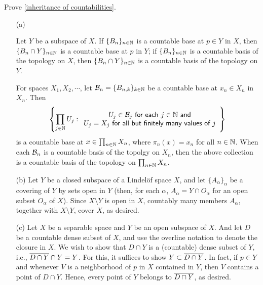 \begin{prob}\label{inheritance: countabilities}
    Prove \cref{inheritance of countabilities}.
\end{prob}
\begin{sol}
    \begin{enumerate}
        \item[(a)]
        {
            Let $Y$ be a subspace of $X$.
            If $\{B_n\}_{n\in{\mathbb{N}}}$ is a countable base at $p\in Y$ in $X$, then $\{B_n\cap Y\}_{n\in{\mathbb{N}}}$ is a countable base at $p$ in $Y$; if $\{B_n\}_{n\in{\mathbb{N}}}$ is a countable basis of the topology on $X$, then $\{B_n\cap Y\}_{n\in{\mathbb{N}}}$ is a countable basis of the topology on $Y$.

            For spaces $X_1, X_2, \cdots$, let ${\mathcal{B}}_n=\{B_{n, k}\}_{k\in{\mathbb{N}}}$ be a countable base at $x_n\in X_n$ in $X_n$.
            Then
            \begin{align*}
                \left\{
                    \prod_{j\in{\mathbb{N}}} U_j:
                    \begin{array}{c}
                        \textsf{$U_j\in {\mathcal{B}}_j$ for each $j\in{\mathbb{N}}$ and}\\
                        \textsf{$U_j=X_j$ for all but finitely many values of $j$}
                    \end{array}
                \right\}
            \end{align*}
            is a countable base at $x\in \prod_{n\in{\mathbb{N}}} X_n$, where $\pi_n(x)=x_n$ for all $n\in{\mathbb{N}}$.
            When each ${\mathcal{B}}_n$ is a countable basis of the topolgy on $X_n$, then the above collection is a countable basis of the topology on $\prod_{n\in{\mathbb{N}}} X_n$.
        }
        \item[(b)]
        {
            Let $Y$ be a closed subspace of a Lindel\"of space $X$, and let $\{A_\alpha\}_\alpha$ be a covering of $Y$ by sets open in $Y$ (then, for each $\alpha$, $A_\alpha=Y\cap O_\alpha$ for an open subset $O_\alpha$ of $X$).
            Since $X\setminus Y$ is open in $X$, countably many members $A_\alpha$, together with $X\setminus Y$, cover $X$, as desired.
        }
        \item[(c)]
        {
            Let $X$ be a separable space and $Y$ be an open subspace of $X$.
            And let $D$ be a countable dense subset of $X$, and use the overline notation to denote the closure in $X$.
            We wish to show that $D\cap Y$ is a (countable) dense subset of $Y$, i.e., $\overline{D\cap Y}\cap Y=Y$.
            For this, it suffices to show $Y\subset\overline{D\cap Y}$.
            In fact, if $p\in Y$ and whenever $V$ is a neighborhood of $p$ in $X$ contained in $Y$, then $V$ contains a point of $D\cap Y$.
            Hence, every point of $Y$ belongs to $\overline{D\cap Y}$, as desired.
        }
    \end{enumerate}
\end{sol}

